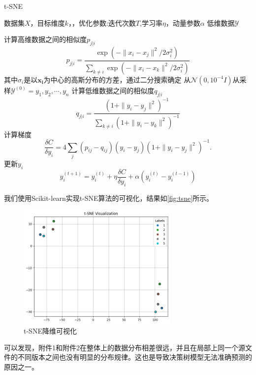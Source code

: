 \begin{breakablealgorithm}
	\caption{t-SNE}
	\label{alg:tsne}
	\begin{algorithmic}
		\REQUIRE 数据集$X$，目标维度$k$，，优化参数:迭代次数$T$,学习率$\eta$，动量参数$\alpha$
		\ENSURE  低维数据$\mathcal{Y}$

		\STATE 计算高维数据之间的相似度$p_{j|
					i}$
		\[
		p_{j|i}=\frac{\exp\left(-\|x_i-x_j\|^2/2\sigma_i^2\right)}{\sum_{k\neq i}\exp\left(-\|x_i-x_k\|^2/2\sigma_i^2\right)}
		\]
		其中$\sigma_i$是以$\boldsymbol{x_i}$为中心的高斯分布的方差，通过二分搜索确定
		\STATE 从$\mathcal{N}(0,10^{-4}I)$从采样$\mathcal{Y}^{(0)}={y_1,y_2,\cdots,y_n}$
		\STATE 计算低维数据之间的相似度$q_{j|i}$
		\[q_{j|i}=\frac{(1+\|y_i-y_j\|^2)^{-1}}{\sum_{k\neq i}(1+\|y_i-y_k\|^2)^{-1}}\]
		\STATE 计算梯度
		\[
			\frac{\delta C}{\delta y_i}=4\sum_j(p_{ij}-q_{ij})(y_i-y_j)\left(1+\|y_i-y_j\|^2\right)^{-1}.
		\]
		\STATE 更新$y_i$
		\[
			y_i^{(t+1)}=y_i^{(t)}+\eta\frac{\delta C}{\delta y_i}+\alpha(y_i^{(t)}-y_i^{(t-1)})
		\]
		\ENDFOR
	\end{algorithmic}
\end{breakablealgorithm}
我们使用Scikit-learn\cite{scikit-learn}实现t-SNE算法的可视化，结果如\autoref{fig:tsne}所示。
\begin{figure}[H]
	\centering
	\includegraphics[width=0.7\textwidth]{figures/tsne.png}
	\caption{t-SNE降维可视化}
	\label{fig:tsne}
\end{figure}
可以发现，附件1和附件2在整体上的数据分布相差很远，并且在局部上同一个源文件的不同版本之间也没有明显的分布规律。这也是导致决策树模型无法准确预测的原因之一。
\vspace{1cm}
